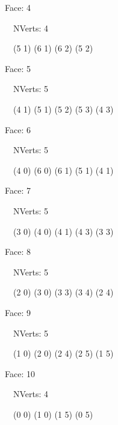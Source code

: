 \documentclass{article}
\begin{document}
    {\footnotesize

    Face: 4

    \   \    NVerts: 4

     \   \   (5 1) (6 1) (6 2) (5 2)}

    {\footnotesize

    Face: 5

    \   \    NVerts: 5

     \   \   (4 1) (5 1) (5 2) (5 3) (4 3)}

    {\footnotesize

    Face: 6

    \   \    NVerts: 5

     \   \   (4 0) (6 0) (6 1) (5 1) (4 1)}

    {\footnotesize

    Face: 7

    \   \    NVerts: 5

     \   \   (3 0) (4 0) (4 1) (4 3) (3 3)}

    {\footnotesize

    Face: 8

    \   \    NVerts: 5

     \   \   (2 0) (3 0) (3 3) (3 4) (2 4)}

    {\footnotesize

    Face: 9

    \   \    NVerts: 5

     \   \   (1 0) (2 0) (2 4) (2 5) (1 5)}

    {\footnotesize

    Face: 10

    \   \    NVerts: 4

     \   \   (0 0) (1 0) (1 5) (0 5)}


     \newpage
\end{document}
